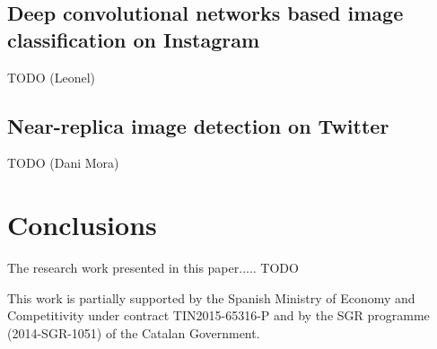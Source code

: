 \documentclass[smallextended]{svjour3}       %
\begin{document}
\subsection{Deep convolutional networks based image classification on Instagram}

TODO (Leonel)

\subsection{Near-replica image detection on Twitter}

TODO (Dani Mora)




%
\section{Conclusions}
%
The research work presented in this paper..... TODO

\begin{acknowledgements}
This work is partially supported by the Spanish Ministry of Economy and Competitivity under contract TIN2015-65316-P and by the SGR programme (2014-SGR-1051) of the Catalan Government.
\end{acknowledgements}



\end{document}

